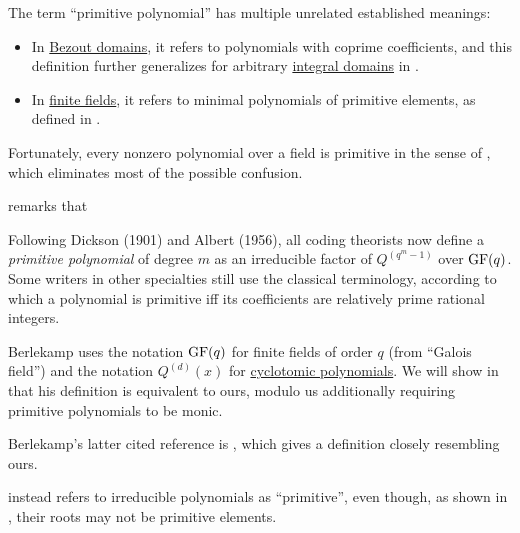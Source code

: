 \begin{remark}\label{rem:primitive_polynomial_terminology}
  The term \enquote{primitive polynomial} has multiple unrelated established meanings:
  \begin{itemize}
    \item In \hyperref[def:bezout_domain]{Bezout domains}, it refers to polynomials with coprime coefficients, and this definition further generalizes for arbitrary \hyperref[def:integral_domain]{integral domains} in .

    \item In \hyperref[def:finite_field]{finite fields}, it refers to minimal polynomials of primitive elements, as defined in .
  \end{itemize}

  Fortunately, every nonzero polynomial over a field is primitive in the sense of , which eliminates most of the possible confusion.

   remarks that
  \begin{displayquote}
    Following Dickson (1901) and Albert (1956), all coding theorists now define a \textit{primitive polynomial} of degree \( m \) as an irreducible factor of \( Q^{(q^m - 1)} \) over \( \op{GF}(q) \). Some writers in other specialties still use the classical terminology, according to which a polynomial is primitive iff its coefficients are relatively prime rational integers.
  \end{displayquote}

  Berlekamp uses the notation \( \op{GF}(q) \) for finite fields of order \( q \) (from \enquote{Galois field}) and the notation \( Q^{(d)}(x) \) for \hyperref[def:cyclotomic_polynomial]{cyclotomic polynomials}. We will show in  that his definition is equivalent to ours, modulo us additionally requiring primitive polynomials to be monic.

  Berlekamp's latter cited reference is \cite{Albert1956Algebra}, which gives a definition closely resembling ours.

   instead refers to irreducible polynomials as \enquote{primitive}, even though, as shown in , their roots may not be primitive elements.
\end{remark}

